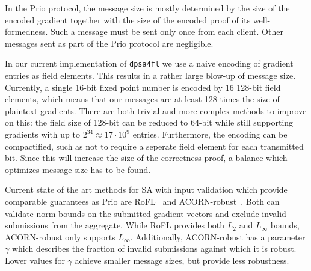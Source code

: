 \documentclass{article}
\begin{document}
In the Prio protocol, the message size is mostly determined by the size of the
encoded gradient together with the size of the encoded proof of its
well-formedness. Such a message must be sent only once from each client. Other
messages sent as part of the Prio protocol are negligible.

In our current implementation of \texttt{dpsa4fl} we use a naive encoding of
gradient entries as field elements. This results in a rather large blow-up of
message size. Currently, a single 16-bit fixed point number is encoded by 16
128-bit field elements, which means that our messages are at least 128 times
the size of plaintext gradients.
There are both trivial and more complex methods to improve on this: the field
size of 128-bit can be reduced to 64-bit while still supporting gradients with
up to $2^{34} \approx 17 \cdot 10^9$ entries. Furthermore, the encoding can be
compactified, such as not to require a seperate field element for each
transmitted bit. Since this will increase the size of the correctness proof,
a balance which optimizes message size has to be found.

Current state of the art methods for SA with input validation which provide
comparable guarantees as Prio are RoFL~\cite{rofl} and ACORN-robust~\cite{acorn}. Both
can validate norm bounds on the submitted gradient vectors and exclude invalid
submissions from the aggregate. While RoFL provides both $L_2$  and $L_\infty$
bounds, ACORN-robust only supports $L_\infty$. Additionally, ACORN-robust has a
parameter $\gamma$ which describes the fraction of invalid submissions against
which it is robust. Lower values for $\gamma$ achieve smaller message sizes, but
provide less robustness.
\end{document}
